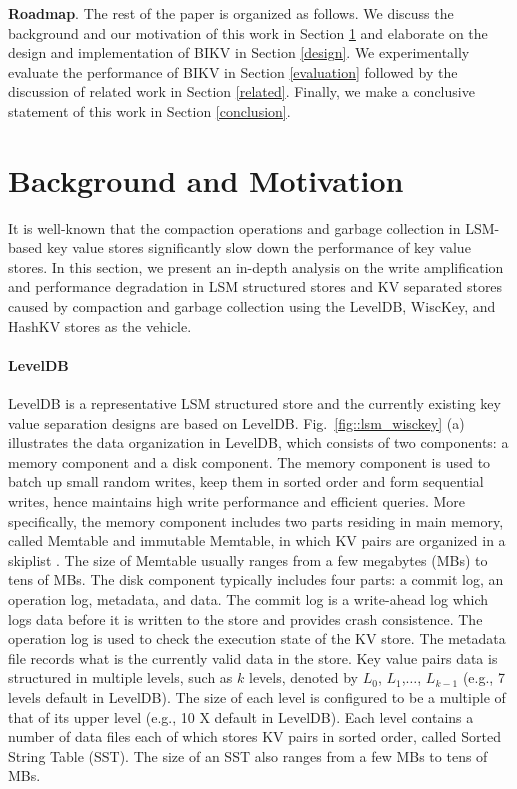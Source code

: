 \documentclass[sigconf]{acmart}
\begin{document}
\textbf{Roadmap}. The rest of the paper is organized as follows. We discuss the background and our motivation of this work in Section \ref{motivation} and elaborate on  the design and implementation of BIKV in Section \ref{design}. We experimentally evaluate the performance of BIKV in Section \ref{evaluation} followed by the discussion of related work in Section \ref{related}. Finally, we make a conclusive statement of this work in Section \ref{conclusion}.

\section{Background and Motivation} \label{motivation}
It is well-known that the compaction operations and garbage collection in LSM-based key value stores significantly slow down the performance of key value stores.  In this section, we present an in-depth analysis on the write amplification and performance degradation in LSM structured stores and KV separated stores caused by compaction and garbage collection using the LevelDB, WiscKey, and HashKV stores as the vehicle. 

\paragraph{LevelDB} LevelDB \cite{LevelDB} is a representative LSM structured store and the currently existing key value separation designs are based on LevelDB. Fig.~\ref{fig::lsm_wisckey} (a) illustrates the data organization in LevelDB, which consists of two components: a memory component and a disk component. The memory component is used to batch up small random writes, keep them in sorted order and form sequential writes, hence maintains high write performance and efficient queries. More specifically, the memory component includes two parts residing in main memory, called Memtable and immutable Memtable, in which KV pairs are organized in a skiplist \cite{skiplist}. The size of Memtable usually ranges from a few megabytes (MBs) to tens of MBs. The disk component typically includes four parts: a commit log, an operation log, metadata, and data. The commit log is a write-ahead log which logs data before it is written to the store and provides crash consistence. The operation log is used to check the execution state of the KV store. The metadata file records what is the currently valid data in the store. Key value pairs data is structured in multiple levels, such as $k$ levels, denoted by $L_0$, $L_1$,$\ldots$, $L_{k-1}$ (e.g., 7 levels default in LevelDB). The size of each level is configured to be a multiple of that of its upper level (e.g., 10 X default in LevelDB). Each level contains a number of data files each of which stores KV pairs in sorted order, called Sorted String Table (SST). The size of an SST also ranges from a few MBs to tens of MBs.
\end{document}

